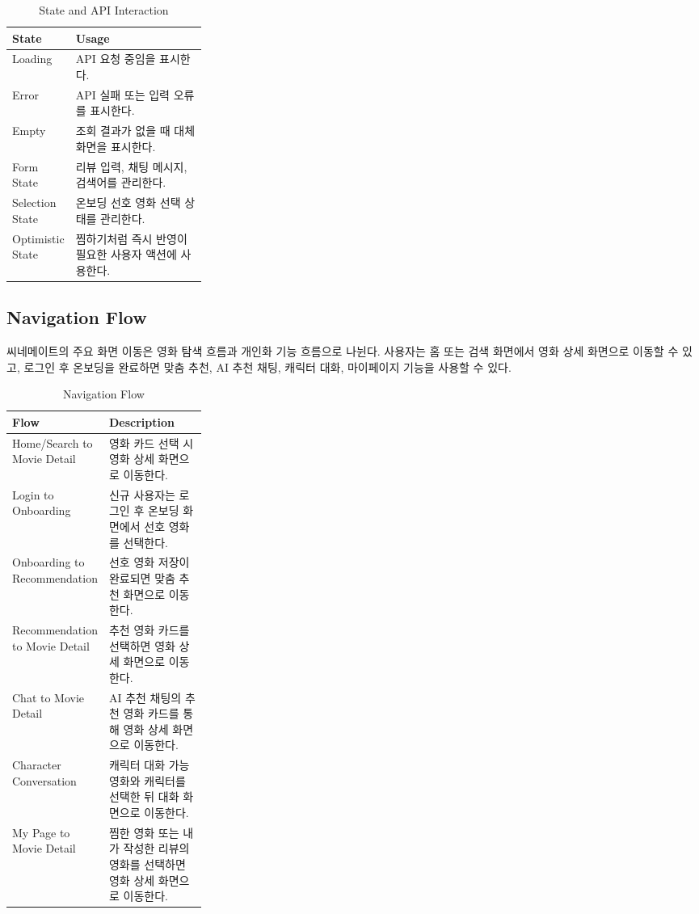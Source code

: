 \documentclass[11pt,a4paper]{article}
\renewcommand{\arraystretch}{1.18}
\begin{document}
\begin{table}[H]
\centering
\small
\setlength{\tabcolsep}{5pt}
\renewcommand{\arraystretch}{1.28}
\begin{tabularx}{\linewidth}{@{}>{\RaggedRight\arraybackslash}p{0.28\linewidth}>{\RaggedRight\arraybackslash}X@{}}
\toprule
\textbf{State} & \textbf{Usage} \\
\midrule
Loading & API 요청 중임을 표시한다. \\
Error & API 실패 또는 입력 오류를 표시한다. \\
Empty & 조회 결과가 없을 때 대체 화면을 표시한다. \\
Form State & 리뷰 입력, 채팅 메시지, 검색어를 관리한다. \\
Selection State & 온보딩 선호 영화 선택 상태를 관리한다. \\
Optimistic State & 찜하기처럼 즉시 반영이 필요한 사용자 액션에 사용한다. \\
\bottomrule
\end{tabularx}
\caption{State and API Interaction}
\end{table}

\hypertarget{navigation-flow}{%
\subsection{Navigation Flow}\label{navigation-flow}}

씨네메이트의 주요 화면 이동은 영화 탐색 흐름과 개인화 기능 흐름으로 나뉜다. 사용자는 홈 또는 검색 화면에서 영화 상세 화면으로 이동할 수 있고, 로그인 후 온보딩을 완료하면 맞춤 추천, AI 추천 채팅, 캐릭터 대화, 마이페이지 기능을 사용할 수 있다.

\begin{table}[H]
\centering
\small
\setlength{\tabcolsep}{5pt}
\renewcommand{\arraystretch}{1.28}
\begin{tabularx}{\linewidth}{@{}>{\RaggedRight\arraybackslash}p{0.28\linewidth}>{\RaggedRight\arraybackslash}X@{}}
\toprule
\textbf{Flow} & \textbf{Description} \\
\midrule
Home/Search to Movie Detail & 영화 카드 선택 시 영화 상세 화면으로 이동한다. \\
Login to Onboarding & 신규 사용자는 로그인 후 온보딩 화면에서 선호 영화를 선택한다. \\
Onboarding to Recommendation & 선호 영화 저장이 완료되면 맞춤 추천 화면으로 이동한다. \\
Recommendation to Movie Detail & 추천 영화 카드를 선택하면 영화 상세 화면으로 이동한다. \\
Chat to Movie Detail & AI 추천 채팅의 추천 영화 카드를 통해 영화 상세 화면으로 이동한다. \\
Character Conversation & 캐릭터 대화 가능 영화와 캐릭터를 선택한 뒤 대화 화면으로 이동한다. \\
My Page to Movie Detail & 찜한 영화 또는 내가 작성한 리뷰의 영화를 선택하면 영화 상세 화면으로 이동한다. \\
\bottomrule
\end{tabularx}
\caption{Navigation Flow}
\end{table}
\end{document}
